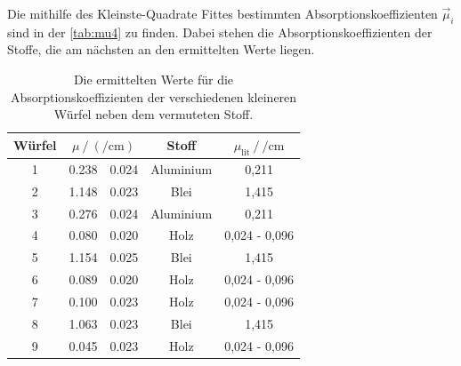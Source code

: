   \noindent Die mithilfe des Kleinste-Quadrate Fittes bestimmten Absorptionskoeffizienten $\vec{\mu}_i$ sind in der \autoref{tab:mu4} zu finden. 
  Dabei stehen die Absorptionskoeffizienten der Stoffe, die am nächsten an den ermittelten Werte liegen. 

  \begin{table}[H]
    \centering
    \caption{Die ermittelten Werte für die Absorptionskoeffizienten der verschiedenen kleineren Würfel neben dem vermuteten Stoff.}
    \label{tab:mu4}
    \begin{tabular}{c S[table-format=1.3] @{${}\pm{}$} S[table-format=1.3] c c}
      \toprule
      {Würfel} &  & {Stoff} & {$\mu_{\text{lit}} \mathbin{/} \si{\per\centi\metre}$} \\
       & 0.238 & 0.024 & Aluminium & 0,211 \\
      2 & 1.148 & 0.023 & Blei      & 1,415 \\
      3 & 0.276 & 0.024 & Aluminium & 0,211 \\
      4 & 0.080 & 0.020 & Holz      & 0,024 - 0,096 \\
      5 & 1.154 & 0.025 & Blei      & 1,415 \\
      6 & 0.089 & 0.020 & Holz      &0,024 - 0,096 \\
      7 & 0.100 & 0.023 & Holz      & 0,024 - 0,096 \\
      8 & 1.063 & 0.023 & Blei      & 1,415 \\
      9 & 0.045 & 0.023 & Holz      & 0,024 - 0,096 \\
      \bottomrule
    \end{tabular}
  \end{table}

